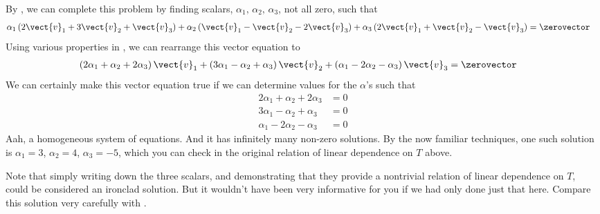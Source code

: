 By , we can complete this problem by finding scalars, $\alpha_1,\,\alpha_2,\,\alpha_3$, not all zero, such that
%
\begin{align*}
\alpha_1\left(2\vect{v}_1+3\vect{v}_2+\vect{v}_3\right)+
\alpha_2\left(\vect{v}_1-\vect{v}_2-2\vect{v}_3\right)+
\alpha_3\left(2\vect{v}_1+\vect{v}_2-\vect{v}_3\right)
&=
\zerovector
\end{align*}
%
Using various properties in , we can rearrange this vector equation to
%
\begin{align*}
\left(2\alpha_1+\alpha_2+2\alpha_3\right)\vect{v}_1+
\left(3\alpha_1-\alpha_2+\alpha_3\right)\vect{v}_2+
\left(\alpha_1-2\alpha_2-\alpha_3\right)\vect{v}_3
&=
\zerovector
%
\end{align*}
%
We can certainly make this vector equation true if we can determine values for the $\alpha$'s such that
%
\begin{align*}
2\alpha_1+\alpha_2+2\alpha_3&=0\\
3\alpha_1-\alpha_2+\alpha_3&=0\\
\alpha_1-2\alpha_2-\alpha_3&=0
\end{align*}
%
Aah, a homogeneous system of equations.  And it has infinitely many non-zero solutions.  By the now familiar techniques, one such solution is $\alpha_1=3$, $\alpha_2=4$, $\alpha_3=-5$, which you can check in the original relation of linear dependence on $T$ above.\par
%
Note that simply writing down the three scalars, and demonstrating that they provide a nontrivial relation of linear dependence on $T$, could be considered an ironclad solution.  But it wouldn't have been very informative for you if we had only done just that here.  Compare this solution very carefully with .